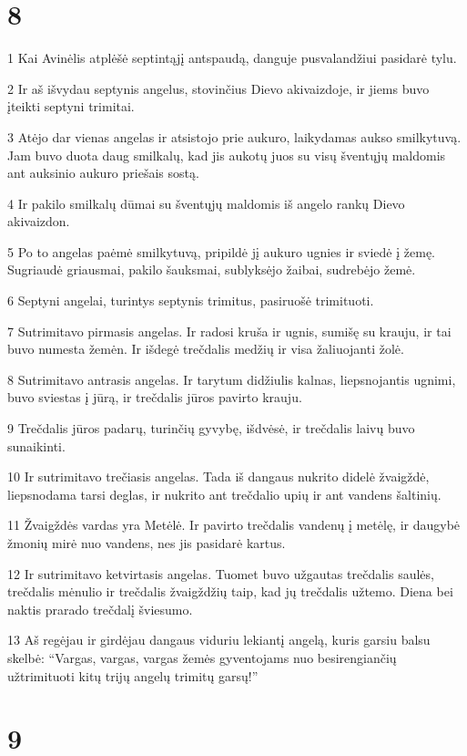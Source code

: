 \chapter{8}


\par 1 Kai Avinėlis atplėšė septintąjį antspaudą, danguje pusvalandžiui pasidarė tylu. 
\par 2 Ir aš išvydau septynis angelus, stovinčius Dievo akivaizdoje, ir jiems buvo įteikti septyni trimitai. 
\par 3 Atėjo dar vienas angelas ir atsistojo prie aukuro, laikydamas aukso smilkytuvą. Jam buvo duota daug smilkalų, kad jis aukotų juos su visų šventųjų maldomis ant auksinio aukuro priešais sostą. 
\par 4 Ir pakilo smilkalų dūmai su šventųjų maldomis iš angelo rankų Dievo akivaizdon. 
\par 5 Po to angelas paėmė smilkytuvą, pripildė jį aukuro ugnies ir sviedė į žemę. Sugriaudė griausmai, pakilo šauksmai, sublyksėjo žaibai, sudrebėjo žemė. 
\par 6 Septyni angelai, turintys septynis trimitus, pasiruošė trimituoti. 
\par 7 Sutrimitavo pirmasis angelas. Ir radosi kruša ir ugnis, sumišę su krauju, ir tai buvo numesta žemėn. Ir išdegė trečdalis medžių ir visa žaliuojanti žolė. 
\par 8 Sutrimitavo antrasis angelas. Ir tarytum didžiulis kalnas, liepsnojantis ugnimi, buvo sviestas į jūrą, ir trečdalis jūros pavirto krauju. 
\par 9 Trečdalis jūros padarų, turinčių gyvybę, išdvėsė, ir trečdalis laivų buvo sunaikinti. 
\par 10 Ir sutrimitavo trečiasis angelas. Tada iš dangaus nukrito didelė žvaigždė, liepsnodama tarsi deglas, ir nukrito ant trečdalio upių ir ant vandens šaltinių. 
\par 11 Žvaigždės vardas yra Metėlė. Ir pavirto trečdalis vandenų į metėlę, ir daugybė žmonių mirė nuo vandens, nes jis pasidarė kartus. 
\par 12 Ir sutrimitavo ketvirtasis angelas. Tuomet buvo užgautas trečdalis saulės, trečdalis mėnulio ir trečdalis žvaigždžių taip, kad jų trečdalis užtemo. Diena bei naktis prarado trečdalį šviesumo. 
\par 13 Aš regėjau ir girdėjau dangaus viduriu lekiantį angelą, kuris garsiu balsu skelbė: “Vargas, vargas, vargas žemės gyventojams nuo besirengiančių užtrimituoti kitų trijų angelų trimitų garsų!”


\chapter{9}


